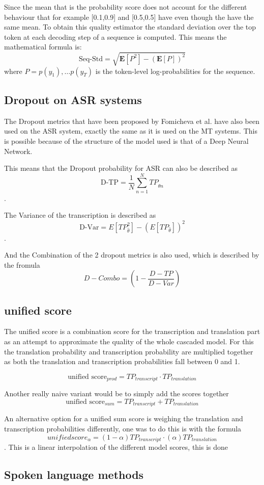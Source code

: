 Since the mean that is the probability score does not account for the different behaviour that for example [0.1,0.9] and [0.5,0.5] have even though the have the same mean. 
To obtain this quality estimator the standard deviation over the top token at each decoding step of a sequence is computed.
This means the mathematical formula is: $$\text{Seq-Std}=\sqrt{\mathbf{E}[P^2]-(\mathbf{E}[P])^2}$$ where $P=p(y_1) , \dots p(y_T)$ is the token-level log-probabilities for the sequence.


\subsection{Dropout on ASR systems}
The Dropout metrics that have been proposed by Fomicheva et al. have also been used on the ASR system, exactly the same as it is used on the MT systems. This is possible because of the structure of the model used is that of a Deep Neural Network. 

This means that the Dropout probability for ASR can also be described as $$\text{D-TP}=\frac{1}{N}\sum_{n=1}^N TP_{\hat\theta n}$$.

The Variance of the transcription is described as $$\text{D-Var}=E[TP_{\hat\theta}^2]-(E[TP_{\hat\theta}])^2$$. 

And the Combination of the 2 dropout metrics is also used, which is described by the fromula $$D-Combo=(1-\frac{D-TP}{D-Var})$$

\subsection{unified score}
The unified score is a combination score for the transcription and translation part as an attempt to approximate the quality of the whole cascaded model. 
For this the translation probability and transcription probability are multiplied together as both the translation and transcription probabilities fall between 0 and 1. 

$$\text{unified score}_{prod}= TP_{transcript}\cdot TP_{translation}$$

Another really naive variant would be to simply add the scores together
$$\text{unified score}_{sum}= TP_{transcript}+TP_{translation}$$

An alternative option for a unified sum score is weighing the translation and transcription probabilities differently, one was to do this is with the formula $$unifiedscore_\alpha= (1-\alpha) TP_{transcript} \cdot (\alpha)TP_{translation}$$. This is a linear interpolation of the different model scores, this is done 

\subsection{Spoken language methods}
